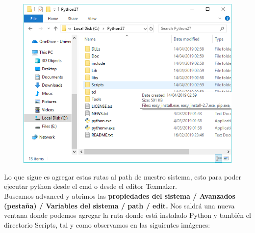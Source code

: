 \documentclass{article}
\begin{document}
\begin{figure}[h!]
  \centering
  \includegraphics[scale=0.75]{./imagenes/python27_install3.png}
\end{figure}

Lo que sigue es agregar estas rutas al path de nuestro sistema, esto para poder
ejecutar python desde el cmd o desde el editor Texmaker.\\

Buscamos advanced y abrimos las \textbf{propiedades del sistema / Avanzados
(pestaña) / Variables del sistema / path / edit.} Nos saldrá una nueva ventana donde podemos
agregar la ruta donde está instalado Python y también el directorio Scripts,
tal y como observamos en las siguientes imágenes:
\end{document}
